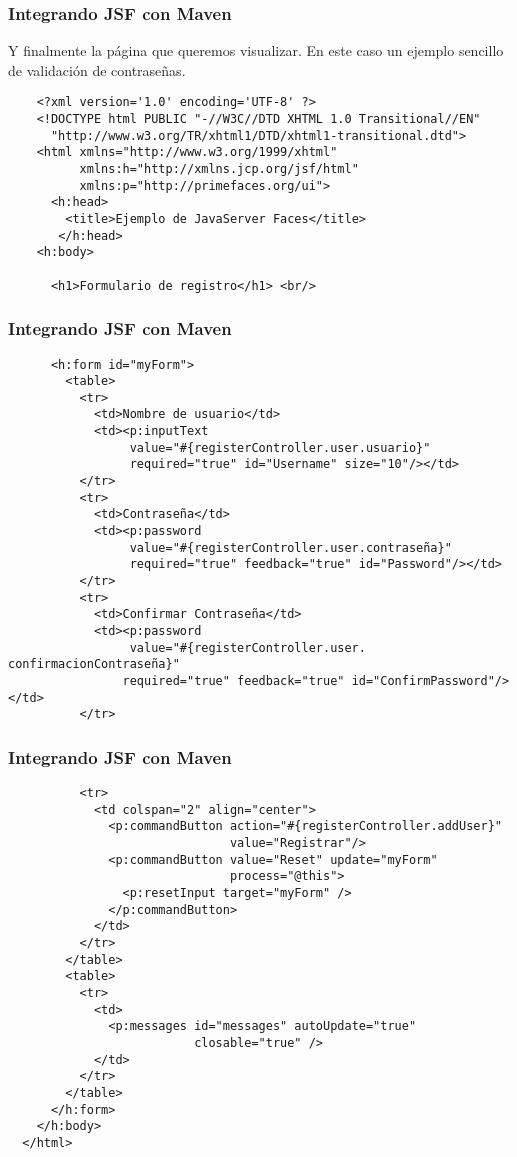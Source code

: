 \documentclass{beamer}
\begin{document}
\begin{frame}[fragile]
  \frametitle{Integrando JSF con Maven}

  Y finalmente la página que queremos visualizar. En este caso un
  ejemplo sencillo de validación de contraseñas.

  \begin{verbatim}
    <?xml version='1.0' encoding='UTF-8' ?>
    <!DOCTYPE html PUBLIC "-//W3C//DTD XHTML 1.0 Transitional//EN"
      "http://www.w3.org/TR/xhtml1/DTD/xhtml1-transitional.dtd">
    <html xmlns="http://www.w3.org/1999/xhtml"
          xmlns:h="http://xmlns.jcp.org/jsf/html"
          xmlns:p="http://primefaces.org/ui">
      <h:head>
        <title>Ejemplo de JavaServer Faces</title>
       </h:head>
    <h:body>

      <h1>Formulario de registro</h1> <br/>
  \end{verbatim}
\end{frame}

\begin{frame}[fragile]
  \frametitle{Integrando JSF con Maven}
  \begin{verbatim}
      <h:form id="myForm">
        <table>
          <tr>
            <td>Nombre de usuario</td>
            <td><p:inputText
                 value="#{registerController.user.usuario}"
                 required="true" id="Username" size="10"/></td>
          </tr>
          <tr>
            <td>Contraseña</td>
            <td><p:password
                 value="#{registerController.user.contraseña}"
                 required="true" feedback="true" id="Password"/></td>
          </tr>
          <tr>
            <td>Confirmar Contraseña</td>
            <td><p:password
                 value="#{registerController.user. confirmacionContraseña}"
                required="true" feedback="true" id="ConfirmPassword"/></td>
          </tr>
  \end{verbatim}
\end{frame}

\begin{frame}[fragile]
  \frametitle{Integrando JSF con Maven}
  \begin{verbatim}
          <tr>
            <td colspan="2" align="center">
              <p:commandButton action="#{registerController.addUser}"
                               value="Registrar"/>
              <p:commandButton value="Reset" update="myForm"
                               process="@this">
                <p:resetInput target="myForm" />
              </p:commandButton>
            </td>
          </tr>
        </table>
        <table>
          <tr>
            <td>
              <p:messages id="messages" autoUpdate="true"
                          closable="true" />
            </td>
          </tr>
        </table>
      </h:form>
    </h:body>
  </html>
  \end{verbatim}
\end{frame}
\end{document}
